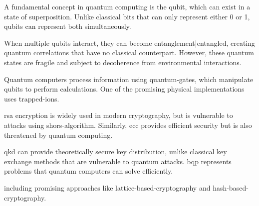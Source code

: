 
A fundamental concept in quantum computing is the \gls{qubit}, which can exist in a 
state of \gls{superposition}. Unlike classical bits that can only represent either 0 or 1, 
qubits can represent both simultaneously.

When multiple \gls{qubit}s interact, they can become \gls{entanglement|entangled}, creating 
quantum correlations that have no classical counterpart. However, these quantum states 
are fragile and subject to \gls{decoherence} from environmental interactions.

Quantum computers process information using \glspl{quantum-gate}, which manipulate qubits 
to perform calculations. One of the promising physical implementations uses \gls{trapped-ions}.

\Gls{rsa} encryption is widely used in modern cryptography, but is vulnerable to attacks 
using \gls{shors-algorithm}. Similarly, \gls{ecc} provides efficient security but is also 
threatened by quantum computing.

\Gls{qkd} can provide theoretically secure key distribution, unlike classical key exchange 
methods that are vulnerable to quantum attacks. \Gls{bqp} represents problems that quantum 
computers can solve efficiently.

including promising approaches like \gls{lattice-based-cryptography} and \gls{hash-based-cryptography}.

% 
